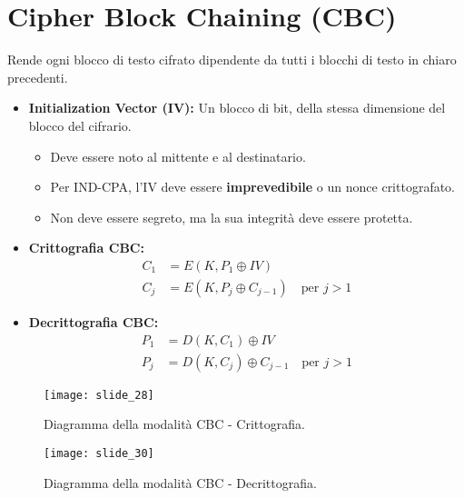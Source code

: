 \documentclass{article}
\begin{document}
\section{Cipher Block Chaining (CBC)}
Rende ogni blocco di testo cifrato dipendente da tutti i blocchi di testo in chiaro precedenti.
\begin{itemize}
    \item \textbf{Initialization Vector (IV):} Un blocco di bit, della stessa dimensione del blocco del cifrario.
    \begin{itemize}
        \item Deve essere noto al mittente e al destinatario.
        \item Per IND-CPA, l'IV deve essere \textbf{imprevedibile} o un nonce crittografato.
        \item Non deve essere segreto, ma la sua integrità deve essere protetta.
    \end{itemize}
    \item \textbf{Crittografia CBC:}
    \begin{align*}
        C_1 &= E(K, P_1 \oplus IV) \\
        C_j &= E(K, P_j \oplus C_{j-1}) \quad \text{per } j > 1
    \end{align*}
    \item \textbf{Decrittografia CBC:}
    \begin{align*}
        P_1 &= D(K, C_1) \oplus IV \\
        P_j &= D(K, C_j) \oplus C_{j-1} \quad \text{per } j > 1
    \end{align*}
\end{itemize}
\begin{figure}[H]
    \centering
    \texttt{[image: slide\_28]} %
    \caption{Diagramma della modalità CBC - Crittografia.}
    \label{fig:cbc_encryption}
\end{figure}
\begin{figure}[H]
    \centering
    \texttt{[image: slide\_30]} %
    \caption{Diagramma della modalità CBC - Decrittografia.}
    \label{fig:cbc_decryption}
\end{figure}
\end{document}
